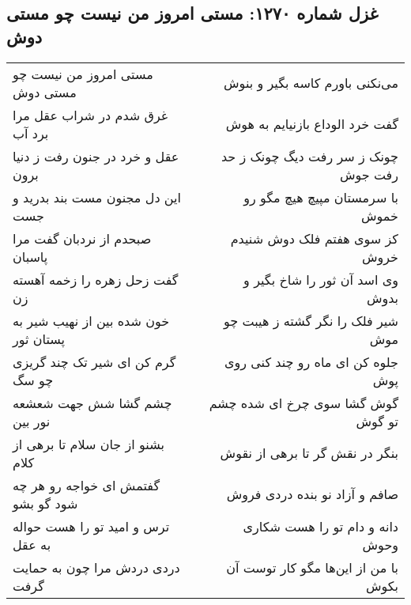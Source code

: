 \begin{center}
\section*{غزل شماره ۱۲۷۰: مستی امروز من نیست چو مستی دوش}
\label{sec:1270}
\begin{longtable}{l p{0.5cm} r}
مستی امروز من نیست چو مستی دوش
&&
می‌نکنی باورم کاسه بگیر و بنوش
\\
غرق شدم در شراب عقل مرا برد آب
&&
گفت خرد الوداع بازنیایم به هوش
\\
عقل و خرد در جنون رفت ز دنیا برون
&&
چونک ز سر رفت دیگ چونک ز حد رفت جوش
\\
این دل مجنون مست بند بدرید و جست
&&
با سرمستان مپیچ هیچ مگو رو خموش
\\
صبحدم از نردبان گفت مرا پاسبان
&&
کز سوی هفتم فلک دوش شنیدم خروش
\\
گفت زحل زهره را زخمه آهسته زن
&&
وی اسد آن ثور را شاخ بگیر و بدوش
\\
خون شده بین از نهیب شیر به پستان ثور
&&
شیر فلک را نگر گشته ز هیبت چو موش
\\
گرم کن ای شیر تک چند گریزی چو سگ
&&
جلوه کن ای ماه رو چند کنی روی پوش
\\
چشم گشا شش جهت شعشعه نور بین
&&
گوش گشا سوی چرخ ای شده چشم تو گوش
\\
بشنو از جان سلام تا برهی از کلام
&&
بنگر در نقش گر تا برهی از نقوش
\\
گفتمش ای خواجه رو هر چه شود گو بشو
&&
صافم و آزاد نو بنده دردی فروش
\\
ترس و امید تو را هست حواله به عقل
&&
دانه و دام تو را هست شکاری وحوش
\\
دردی دردش مرا چون به حمایت گرفت
&&
با من از این‌ها مگو کار توست آن بکوش
\\
\end{longtable}
\end{center}
